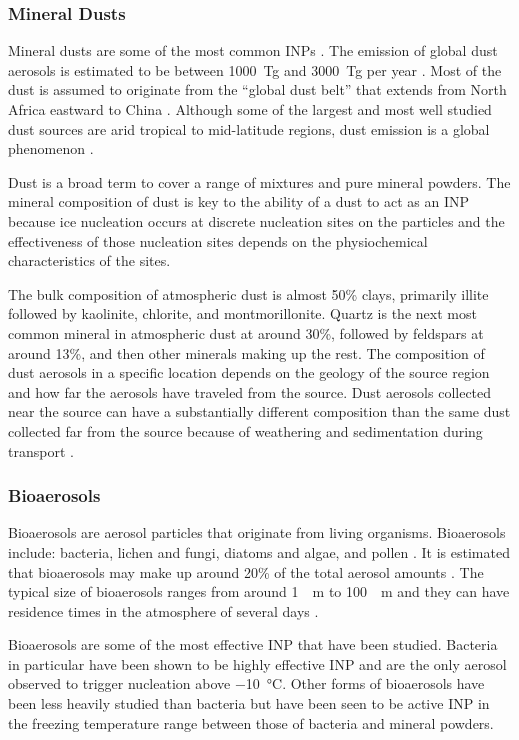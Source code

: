 \subsubsection{Mineral Dusts}
Mineral dusts are some of the most common INPs \citep{mur2012}. The emission of global dust aerosols is estimated to be between \SI{1000}{Tg} and \SI{3000}{Tg} per year \citep{thor2011}. Most of the dust is assumed to originate from the ``global dust belt'' that extends from North Africa eastward to China \citep{pros2002}. Although some of the largest and most well studied dust sources are arid tropical to mid-latitude regions, dust emission is a global phenomenon \citep{bull2016}.

Dust is a broad term to cover a range of mixtures and pure mineral powders. The mineral composition of dust is key to the ability of a dust to act as an INP because ice nucleation occurs at discrete nucleation sites on the particles and the effectiveness of those nucleation sites depends on the physiochemical characteristics of the sites.

The bulk composition of atmospheric dust is almost 50\% clays, primarily illite followed by kaolinite, chlorite, and montmorillonite. Quartz is the next most common mineral in atmospheric dust at around 30\%, followed by feldspars at around 13\%, and then other minerals making up the rest. \citep{mur2012} The composition of dust aerosols in a specific location depends on the geology of the source region and how far the aerosols have traveled from the source. Dust aerosols collected near the source can have a substantially different composition than the same dust collected far from the source because of weathering and sedimentation during transport \citep{mur2012}.

\subsubsection{Bioaerosols}
Bioaerosols are aerosol particles that originate from living organisms. Bioaerosols include: bacteria, lichen and fungi, diatoms and algae, and pollen \citep{mur2012,fro2016}. It is estimated that bioaerosols may make up around 20\% of the total aerosol amounts \citep{jaen2005,jaen2007}. The typical size of bioaerosols ranges from around \SI{1}{\mu m} to \SI{100}{\mu m} and they can have residence times in the atmosphere of several days \citep{bur2009, mur2012,fro2016}.

Bioaerosols are some of the most effective INP that have been studied. Bacteria in particular have been shown to be highly effective INP and are the only aerosol observed to trigger nucleation above \SI{-10}{\degreeCelsius}. Other forms of bioaerosols have been less heavily studied than bacteria but have been seen to be active INP in the freezing temperature range between those of bacteria and mineral powders. \citep{dieh2002, knop2011, mur2012, pumm2012}

